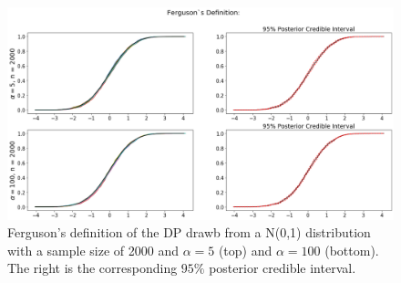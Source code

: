\documentclass[a4paper, 10pt]{article}
\begin{document}
\begin{enumerate}
    \begin{figure}[h!]
        \centering
        \includegraphics[scale = 0.35]{hw1a_2000.png}
        \caption{Ferguson's definition of the DP drawb from a N(0,1) distribution with a sample size of 2000 and $\alpha = 5$ (top) and $\alpha = 100$ (bottom). The right is the corresponding $95\%$ posterior credible interval.}
        \label{1a2000}
    \end{figure}
    

\end{enumerate}
\end{document}
